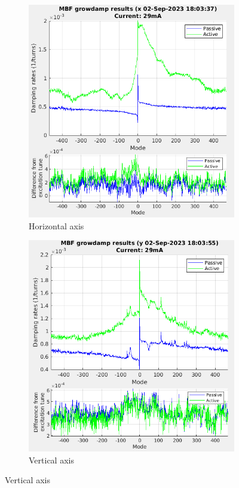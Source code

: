 \documentclass{report}
\begin{document}
 \begin{figure}[hbt]
   \centering
    \begin{subfigure}[b]{0.45\textwidth}
        \includegraphics[width=\textwidth]{vlr_growdamp_x.png}
        \caption{Horizontal axis}
        \label{fig:growdamp_example_x}
    \end{subfigure}
    \begin{subfigure}[b]{0.45\textwidth}
        \includegraphics[width=\textwidth]{vlr_growdamp_y.png}
        \caption{Vertical axis}
        \label{fig:growdamp_example_y}
    \end{subfigure}
    

\end{figure}
\end{document}
